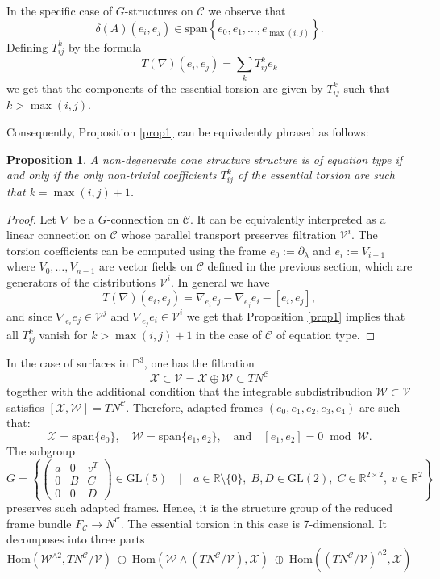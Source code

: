 \documentclass[11pt]{amsart}
\newtheorem{proposition}[theorem]{Proposition}
\theoremstyle{definition}
\newcommand{\R}{\mathbb{R}}
\newcommand{\PP}{\mathbb{P}}
\newcommand{\spn}{\mathrm{span}}
\newcommand{\Hom}{\mathrm{Hom}}
\newcommand{\VV}{\mathcal{V}}
\newcommand{\WW}{\mathcal{W}}
\newcommand{\XX}{\mathcal{X}}
\newcommand{\CC}{\mathcal{C}}
\newcommand{\GL}{\mathrm{GL}}
\begin{document}
In the specific case of $G$-structures on $\CC$ we observe that
\[
\delta(A)(e_i,e_j)\in\spn\left\{e_0,e_1,\ldots,e_{\max(i,j)}\right\}.
\]
Defining $T_{ij}^k$ by the formula
\[
T(\nabla)(e_i,e_j)=\sum_kT_{ij}^ke_k
\]
we get that the components of the essential torsion are given by $T_{ij}^k$ such that $k>\max(i,j)$.

Consequently, Proposition \ref{prop1} can be equivalently phrased as follows:
\begin{proposition}\label{prop3}
A non-degenerate cone structure structure is of equation type if and only if the only non-trivial coefficients $T_{ij}^k$ of the essential torsion are such that $k=\max(i,j)+1$.
\end{proposition}
\begin{proof}
Let $\nabla$ be a $G$-connection on $\CC$. It can be equivalently interpreted as a linear connection on $\CC$ whose parallel transport preserves filtration $\VV^i$. The torsion coefficients can be computed using the frame $e_0:=\partial_\lambda$ and $e_i:=V_{i-1}$ where $V_0,\ldots,V_{n-1}$ are vector fields on $\CC$ defined in the previous section, which are generators of the distributions $\VV^i$.  In general we have
\[
T(\nabla)(e_i,e_j)=\nabla_{e_i}e_j-\nabla_{e_j}e_i-[e_i,e_j],
\]
and since $\nabla_{e_i}e_j\in\VV^j$ and $\nabla_{e_j}e_i\in\VV^i$ we get that Proposition \ref{prop1} implies that all $T_{ij}^k$ vanish for $k>\max(i,j)+1$ in the case of $\CC$ of equation type.
\end{proof}

In the case of surfaces in $\PP^3$, one has the filtration 
\[
\XX\subset \VV=\XX\oplus\WW\subset TN^\CC
\]
together with the additional condition that the integrable subdistribudion $\WW\subset \VV$ satisfies $[\XX,\WW]=TN^\CC$. Therefore, adapted frames $(e_0,e_1,e_2,e_3,e_4)$ are such that:
\[
\XX=\mathrm{span}\{e_0\},\quad \WW=\mathrm{span}\{e_1,e_2\},\quad \text{and}\quad [e_1,e_2]=0\;\;\mathrm{mod}\;\;\WW.
\]
The subgroup 
\[
G=\left\{\begin{pmatrix}
    a & 0 & v^T\\
   0 & B & C \\ 
   0 & 0 & D
\end{pmatrix}\in \GL(5)\quad \Bigg| \quad a\in\R\setminus\{0\},\; B,D\in\mathrm{GL}(2),\; C\in\R^{2\times 2},\; v\in \R^2\right\}
\]
preserves such adapted frames. Hence, it is the structure group of the reduced frame bundle $F_\CC\rightarrow N^\CC$. The essential torsion in this case is 7-dimensional. It decomposes into three parts
\[
\Hom\left(\WW^{\wedge 2}, TN^\CC/\VV\right)
\;\oplus\;
\Hom\left(\WW\wedge (TN^\CC/\VV),\XX\right)
\;\oplus\;
\Hom\left((TN^\CC/\VV)^{\wedge 2}, \XX\right)
\]
\end{document}
